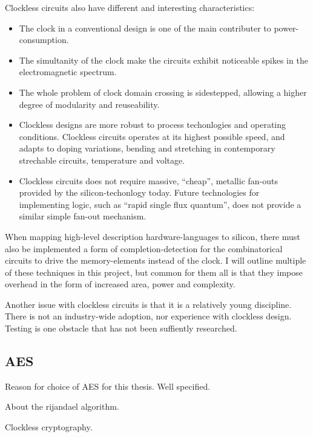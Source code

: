 Clockless circuits also have different and interesting characteristics:
\begin{itemize}
\item The clock in a conventional design is one of the main contributer to
power-consumption. 

\item The simultanity of the clock make the circuits exhibit noticeable
spikes in the electromagnetic spectrum.

\item The whole problem of clock domain crossing is sidestepped, allowing a
higher degree of modularity and reuseability.

\item Clockless designs are more robust to process techonlogies and
operating conditions. Clockless circuits operates at its highest
possible speed, and adapts to doping variations, bending and stretching in
contemporary strechable circuits, temperature and voltage.

\item Clockless circuits does not require massive, ``cheap'', metallic
fan-outs provided by the silicon-techonlogy today. Future technologies
for implementing logic, such as ``rapid single flux quantum'', does not
provide a similar simple fan-out mechanism. 
\end{itemize}

When mapping high-level description hardware-languages to silicon,
there must also be implemented a form of completion-detection for the
combinatorical circuits to drive the memory-elements instead of the
clock. I will outline multiple of these techniques in this project,
but common for them all is that they impose overhead in the form of
increased area, power and complexity.

Another issue with clockless circuits is that it is a relatively young
discipline. There is not an industry-wide adoption, nor experience
with clockless design. Testing is one obstacle that has not been
suffiently researched. 

\subsection{AES}

Reason for choice of AES for this thesis. Well specified.

About the rijandael algorithm.

Clockless cryptography.
